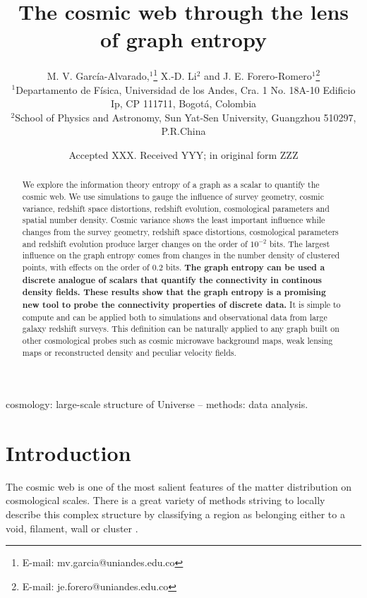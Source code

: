 \documentclass[fleqn,usenatbib]{mnras}
\title[Cosmic Web Graph Entropy]{The cosmic web through the lens of graph entropy}
\author[Garc\'ia-Alvarado et al.]{
M. V. Garc\'ia-Alvarado,$^{1}$\thanks{E-mail: mv.garcia@uniandes.edu.co}
X.-D. Li$^{2}$
and J. E. Forero-Romero$^{1}$\thanks{E-mail: je.forero@uniandes.edu.co}
\\
$^{1}$Departamento de F\'isica, Universidad de los Andes, Cra. 1 No. 18A-10 Edificio Ip, CP 111711, Bogot\'a, Colombia\\
$^{2}$School of Physics and Astronomy, Sun Yat-Sen University, Guangzhou 510297, P.R.China\\
}
\date{Accepted XXX. Received YYY; in original form ZZZ}
\begin{document}
\label{firstpage}
\pagerange{\pageref{firstpage}--\pageref{lastpage}}
\maketitle

\begin{abstract}
  We explore the information theory entropy of a graph as a scalar to
  quantify the cosmic web. 
  We use simulations to gauge the influence of survey geometry, cosmic variance, 
  redshift space distortions, redshift evolution, cosmological parameters and 
  spatial number density.  
  Cosmic variance shows the least important influence while
  changes from the survey geometry, redshift space distortions, cosmological 
  parameters and redshift evolution produce larger changes on the
  order of $10^{-2}$ bits.
  The largest influence on the graph entropy comes from changes in the 
  number density of clustered points, with effects on the order of $0.2$ bits.
\textbf{The graph entropy can be
  used a discrete analogue of scalars that quantify the connectivity in
  continous density fields.
  These results show that the graph entropy is a promising new tool to
  probe the connectivity properties of discrete data.}
  It is simple to compute and can be applied both to simulations and observational data 
  from large galaxy redshift surveys.
  This definition can be naturally applied to any graph built on other cosmological 
  probes such as cosmic microwave background maps, weak lensing maps or reconstructed
  density and peculiar velocity fields.
\end{abstract}
\begin{keywords}
cosmology: large-scale structure of Universe -- methods: data analysis.
\end{keywords}


\section{Introduction}

The cosmic web is one of the most salient features of the matter distribution
on cosmological scales. 
There is a great variety of methods striving to locally describe this complex 
structure by classifying a region as belonging either
to a void, filament, wall or cluster \citep{2018MNRAS.473.1195L}. 
\end{document}
